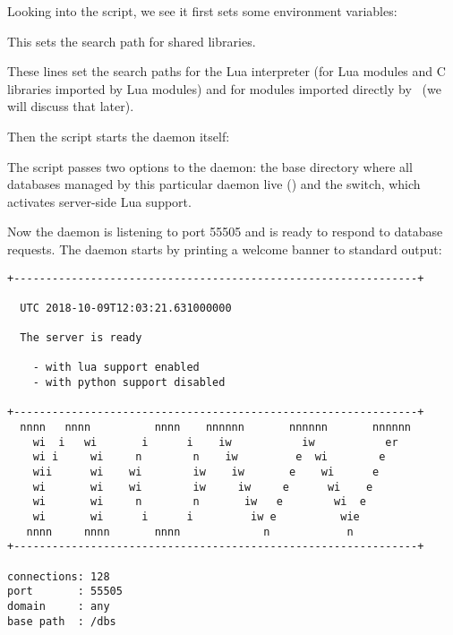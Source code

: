Looking into the script,
we see it first sets some environment variables:


This sets the search path for shared libraries.




These lines set the search paths for the Lua interpreter
(for Lua modules and C libraries imported by Lua modules)
and for  modules imported directly by \nowdb\
(we will discuss that later).

Then the script starts the daemon itself:


The script passes two options to the daemon:
the base directory where all databases
managed by this particular daemon live ()
and the  switch, which activates
server-side Lua support.

Now the daemon is listening to port 55505
and is ready to respond to database requests.
The daemon starts by printing a welcome banner
to standard output:

\begingroup
\small
\begin{minipage}{\textwidth}
\begin{verbatim}
+---------------------------------------------------------------+ 
 
  UTC 2018-10-09T12:03:21.631000000
 
  The server is ready
 
    - with lua support enabled
    - with python support disabled
 
+---------------------------------------------------------------+ 
  nnnn   nnnn          nnnn    nnnnnn       nnnnnn       nnnnnn  
    wi  i   wi       i      i    iw           iw           er   
    wi i     wi     n        n    iw         e  wi        e    
    wii      wi    wi        iw    iw       e    wi      e        
    wi       wi    wi        iw     iw     e      wi    e        
    wi       wi     n        n       iw   e        wi  e        
    wi       wi      i      i         iw e          wie          
   nnnn     nnnn       nnnn             n            n            
+---------------------------------------------------------------+ 

connections: 128
port       : 55505
domain     : any
base path  : /dbs
\end{verbatim}
\end{minipage}
\endgroup

